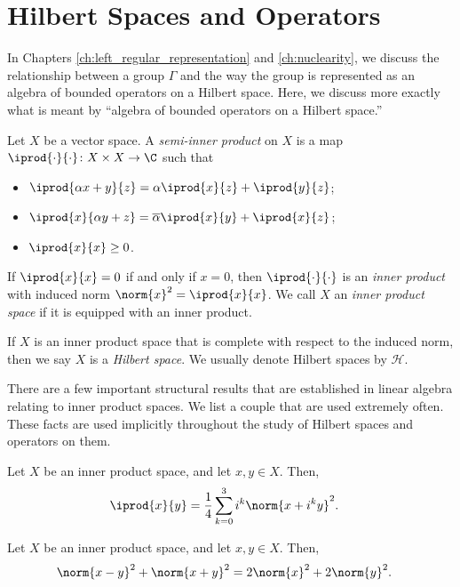 \section{Hilbert Spaces and Operators}%
In Chapters \ref{ch:left_regular_representation} and \ref{ch:nuclearity}, we discuss the relationship between a group $\Gamma$ and the way the group is represented as an algebra of bounded operators on a Hilbert space. Here, we discuss more exactly what is meant by ``algebra of bounded operators on a Hilbert space.''
\begin{definition}\label{def:hilbert_spaces}
  Let $X$ be a vector space. A \textit{semi-inner product} on $X$ is a map $ \iprod{\cdot}{\cdot}\colon X\times X \rightarrow \C $ such that
  \begin{itemize}
    \item $ \iprod{\alpha x + y}{z} = \alpha \iprod{x}{z} + \iprod{y}{z}$;
    \item $ \iprod{x}{\alpha y + z} = \overline{\alpha}\iprod{x}{y} + \iprod{x}{z}$;
    \item $ \iprod{x}{x}\geq 0 $.
  \end{itemize}
  If $ \iprod{x}{x} = 0 $ if and only if $ x = 0 $, then $ \iprod{\cdot}{\cdot} $ is an \textit{inner product} with induced norm $\norm{x}^2 = \iprod{x}{x}$. We call $X$ an \textit{inner product space} if it is equipped with an inner product.\newline

  If $X$ is an inner product space that is complete with respect to the induced norm, then we say $X$ is a \textit{Hilbert space}. We usually denote Hilbert spaces by $ \mathcal{H} $.
\end{definition}
There are a few important structural results that are established in linear algebra relating to inner product spaces. We list a couple that are used extremely often. These facts are used implicitly throughout the study of Hilbert spaces and operators on them.
\begin{theorem}\label{thm:polarization}
  Let $X$ be an inner product space, and let $x,y\in X$. Then,
  \begin{align*}
    \iprod{x}{y} &= \frac{1}{4}\sum_{k=0}^{3} i^k\norm{x + i^ky}^2.
  \end{align*}
\end{theorem}
\begin{theorem}
  Let $X$ be an inner product space, and let $x,y\in X$. Then,
  \begin{align*}
    \norm{x-y}^2 + \norm{x+y}^2 &= 2\norm{x}^2 + 2\norm{y}^2.
  \end{align*}
\end{theorem}
